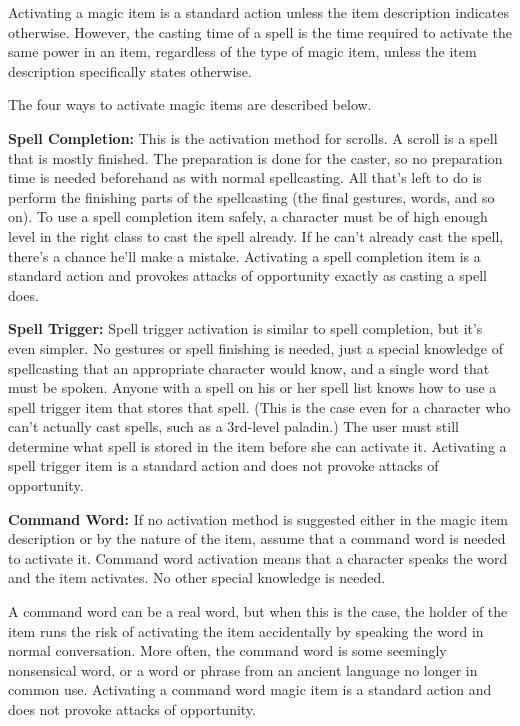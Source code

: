 Activating a magic item is a standard action unless the item description indicates 
otherwise. However, the casting time of a spell is the time required to activate 
the same power in an item, regardless of the type of magic item, unless the item 
description specifically states otherwise.

The four ways to activate magic items are described below.

\textbf{Spell Completion:} This is the activation method for scrolls. A scroll 
is a spell that is mostly finished. The preparation is done for the caster, so 
no preparation time is needed beforehand as with normal spellcasting. All that's 
left to do is perform the finishing parts of the spellcasting (the final gestures, 
words, and so on). To use a spell completion item safely, a character must be of 
high enough level in the right class to cast the spell already. If he can't already 
cast the spell, there's a chance he'll make a mistake. Activating a spell completion 
item is a standard action and provokes attacks of opportunity exactly as casting 
a spell does.

\textbf{Spell Trigger:} Spell trigger activation is similar to spell completion, 
but it's even simpler. No gestures or spell finishing is needed, just a special 
knowledge of spellcasting that an appropriate character would know, and a single 
word that must be spoken. Anyone with a spell on his or her spell list knows how 
to use a spell trigger item that stores that spell. (This is the case even for 
a character who can't actually cast spells, such as a 3rd-level paladin.) The user 
must still determine what spell is stored in the item before she can activate it. 
Activating a spell trigger item is a standard action and does not provoke attacks 
of opportunity.

\textbf{Command Word: }If no activation method is suggested either in the magic 
item description or by the nature of the item, assume that a command word is needed 
to activate it. Command word activation means that a character speaks the word 
and the item activates. No other special knowledge is needed.

A command word can be a real word, but when this is the case, the holder of the 
item runs the risk of activating the item accidentally by speaking the word in 
normal conversation. More often, the command word is some seemingly nonsensical 
word, or a word or phrase from an ancient language no longer in common use. Activating 
a command word magic item is a standard action and does not provoke attacks of 
opportunity.

